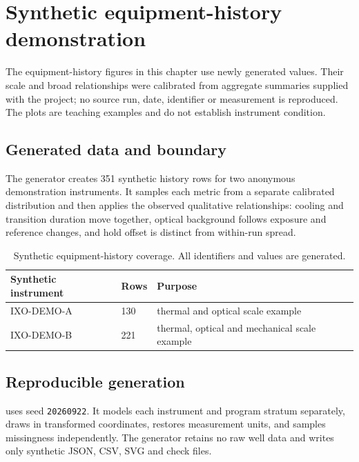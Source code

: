 \chapter{Synthetic equipment-history demonstration}\label{ch:roche}

\begin{notebox}[title={Scope of the demonstration}]
The equipment-history figures in this chapter use newly generated values. Their scale and broad relationships were calibrated from aggregate summaries supplied with the project; no source run, date, identifier or measurement is reproduced. The plots are teaching examples and do not establish instrument condition.
\end{notebox}

\section{Generated data and boundary}
The generator creates 351 synthetic history rows for two anonymous demonstration instruments. It samples each metric from a separate calibrated distribution and then applies the observed qualitative relationships: cooling and transition duration move together, optical background follows exposure and reference changes, and hold offset is distinct from within-run spread.


\begin{table}[htbp]\centering\small
\caption{Synthetic equipment-history coverage. All identifiers and values are generated.}
\begin{tabular}{@{}lll@{}}\toprule
Synthetic instrument & Rows & Purpose\\\midrule
IXO-DEMO-A & 130 & thermal and optical scale example\\
IXO-DEMO-B & 221 & thermal, optical and mechanical scale example\\\bottomrule
\end{tabular}\end{table}

\section{Reproducible generation}
 uses seed \texttt{20260922}. It models each instrument and program stratum separately, draws in transformed coordinates, restores measurement units, and samples missingness independently. The generator retains no raw well data and writes only synthetic JSON, CSV, SVG and check files.

